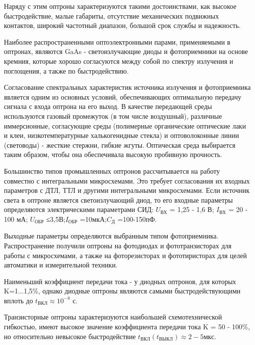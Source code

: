 Наряду с этим оптроны характеризуются такими достоинствами, как высокое быстродействие, малые габариты, отсутствие механических подвижных контактов, широкий частотный диапазон, большой срок службы и надежность.

Наиболее распространенными оптоэлектронными парами, применяемыми в оптронах, являются GaAs - светоизлучающие диоды и фотоприемники на основе кремния, которые хорошо согласуются между собой по спектру излучения и поглощения, а также по быстродействию.

Согласование спектральных характеристик источника излучения и фотоприемника является одним из основных условий, обеспечивающих оптимальную передачу сигнала с входа оптрона на его выход. В качестве передающей среды используются газовый промежуток (в том числе воздушный), различные иммерсионные, согласующие среды (полимерные органические оптические лаки и клеи, низкотемпературные халькогенидные стекла) и оптоволоконные линии (световоды) - жесткие стержни, гибкие жгуты. Оптическая среда выбирается таким образом, чтобы она обеспечивала высокую пробивную прочность.

Большинство типов промышленных оптронов рассчитывается на работу совместно с интегральными микросхемами. Это требует согласования их входных параметров с ДТЛ, ТТЛ и другими интегральными микросхемами. Если источник света в оптроне является светоизлучающий диод, то его входные параметры определяются электрическими параметрами СИД: $U_\text{ВХ}$ = 1,25 - 1,6 В; $I_\text{ВХ}$ = 20 - 100 мА; $U_\text{ОБР}$ ≤3,5В;$I_\text{ОБР}$ =10мкА;$C_\text{Д}$ =100-150пФ.

Выходные параметры определяются выбранным типом фотоприемника. Распространение получили оптроны на фотодиодах и фототранзисторах для работы с микросхемами, а также на фоторезисторах и фототиристорах для целей автоматики и измерительной техники.

Наименьший коэффициент передачи тока - у диодных оптронов, для которых K=1...1,5\%, однако диодные оптроны являются самыми быстродействующими вплоть до $t_\text{ВКЛ} \approx 10^{-8}$ с.

Транзисторные оптроны характеризуются наибольшей схемотехнической гибкостью, имеют высокое значение коэффициента
передачи тока K = 50 - 100\%, но относительно невысокое быстродействие $t_\text{ВКЛ} (t_\text{ВЫКЛ}) \approx 2 - 5 мкс$.

